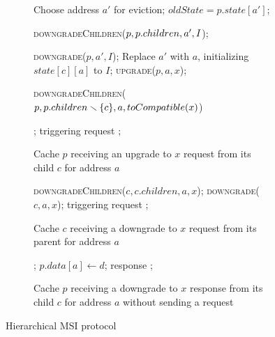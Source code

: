 \begin{figure}

\begin{subfigure}{\linewidth}
\begin{boxedminipage}{\linewidth}
\begin{algorithmic}
    \State Choose address $a'$ for eviction;
    \State {} $oldState = p.state[a']$;
    \State \call{} \parbox[t]{\dimexpr\linewidth-\algorithmicindent}{
             \textsc{downgradeChildren}($\newline p, p.children, a', I$);}
    \State \call{} \textsc{downgrade}($p, a', I$);
    \State Replace $a'$ with $a$, initializing $state[c][a]$ to $I$;
  \EndIf
  \State \call{} \textsc{upgrade}($p, a, x$);
  \State \call{} \parbox[t]{\dimexpr\linewidth-\algorithmicindent}
            {\textsc{downgradeChildren}($\newline p,
                p.children \smallsetminus \{c\}, a, toCompatible(x)$)}
  \State \send{} ;
  \State \remove{} triggering request ;
\EndIf
\end{algorithmic}
\end{boxedminipage}
\caption{Cache $p$ receiving an upgrade to $x$ request from its child $c$ for
address $a$}
\label{dirreq}
\end{subfigure}

\begin{subfigure}{\linewidth}
\begin{boxedminipage}{\linewidth}
\begin{algorithmic}
  \State \textsc{downgradeChildren}($c, c.children, a, x$);
  \State \textsc{downgrade}($c, a, x$);
  \State \remove{} triggering request ;
\EndIf
\end{algorithmic}
\end{boxedminipage}
\caption{Cache $c$ receiving a downgrade to $x$ request from its parent for address $a$}
\label{dirreq}
\end{subfigure}

\begin{subfigure}{\linewidth}
\begin{boxedminipage}{\linewidth}
\begin{algorithmic}
    \State \receive{} ;
    \State $p.data[a] \gets d$;
  \EndIf
  \State \remove{} response ;
\EndIf
\end{algorithmic}
\end{boxedminipage}
\caption{Cache $p$ receiving a downgrade to $x$ response from its child $c$ for
address $a$ without sending a request}
\label{dirreq}
\end{subfigure}

\caption{Hierarchical MSI protocol}
\label{multimsi}
\end{figure}

